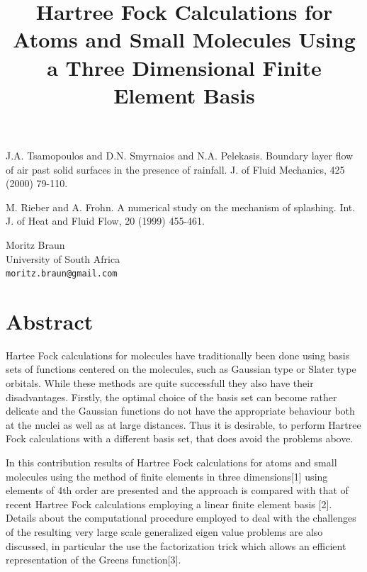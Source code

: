 \documentclass[article, A4, 11pt]{llncs}%
\begin{document}

\begin{thebibliography}{10}
{\sc J.A. Tsamopoulos and D.N. Smyrnaios and N.A. Pelekasis}. {Boundary layer flow of air past solid surfaces in the presence of rainfall}. J. of Fluid Mechanics, 425 (2000) 79-110.

{\sc M. Rieber and A. Frohn}. {A numerical study on the mechanism of splashing}. Int. J. of Heat and Fluid Flow, 20 (1999) 455-461.
\end{thebibliography} %

\title{Hartree Fock Calculations for Atoms and Small Molecules Using  a Three Dimensional  Finite Element Basis}
 \author{} \institute{}
\maketitle
\begin{center}
{\large Moritz Braun}\\
University of South Africa\\
{\tt moritz.braun@gmail.com}
\end{center}

\section*{Abstract}
Hartee Fock calculations for molecules have traditionally been done using basis sets 
of functions centered on  the molecules, such as Gaussian type or Slater type orbitals. While these methods are quite successfull they  also have their disadvantages. Firstly, the optimal choice of the basis set can become rather delicate and the Gaussian functions do not have the appropriate behaviour both at the nuclei as  well as at large distances.
Thus it is desirable, to perform Hartree Fock calculations with a different basis set, that does avoid the problems above.

In this contribution results of Hartree Fock calculations  for atoms and small molecules using the method of finite elements in three dimensions[1] using elements of 4th order are presented and the approach is  compared with that  of recent Hartree Fock calculations employing a linear finite element basis [2].  Details about the computational procedure employed to deal with the challenges of the resulting very large scale generalized eigen value problems are also discussed, in particular the use the factorization trick which allows an efficient representation of the Greens function[3].
\end{document}
